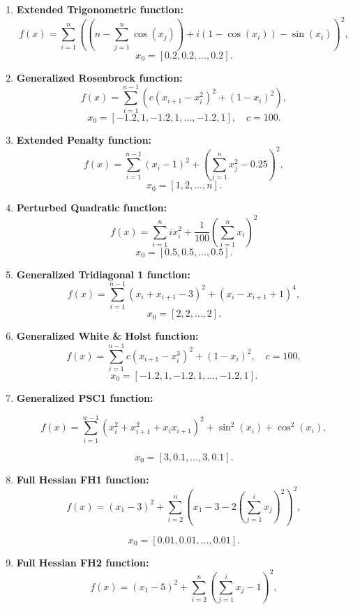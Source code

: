 \begin{enumerate}
    \item \textbf{Extended Trigonometric function:}
    \[
    f(x) = \sum_{i=1}^{n} \left( (n - \sum_{j=1}^{n} \cos(x_j)) + i \left( 1 - \cos(x_i) \right) - \sin(x_i) \right)^2,
    \]
    \[
    x_0 = [0.2, 0.2, \dots, 0.2].
    \]

    \item \textbf{Generalized Rosenbrock function:}
    \[
    f(x) = \sum_{i=1}^{n-1} \left( c(x_{i+1} - x_i^2)^2 + (1 - x_i)^2 \right),
    \]
    \[
    x_0 = [-1.2, 1, -1.2, 1, \dots, -1.2, 1], \quad c = 100.
    \]

    \item \textbf{Extended Penalty function:}
    \[
    f(x) =  \sum_{i=1}^{n-1} (x_i - 1)^2 + \left(\sum_{j=1}^{n}  x_j^2 - 0.25 \right)^2,
    \]
    \[
    x_0 = [1, 2, \dots, n].
    \]

    \item \textbf{Perturbed Quadratic function:}
    \[
    f(x) = \sum_{i=1}^{n} i x_i^2 + \frac{1}{100}\left(\sum_{i=1}^{n} x_i \right)^2
    \]
    \[
    x_0 = [0.5, 0.5, \dots, 0.5].
    \]

    \item \textbf{Generalized Tridiagonal 1 function:}
    \[
    f(x) = \sum_{i=1}^{n-1} ( x_i +  x_{i+1} - 3)^2 + (x_{i} - x_{i+1} + 1)^4,
    \]
    \[
    x_0 = [2, 2, \dots, 2].
    \]

    \item \textbf{Generalized White \& Holst function:}
    \[
    f(x) = \sum_{i=1}^{n-1} c(x_{i+1} - x_i^3)^2 + (1 - x_i)^2 , \quad c = 100,
    \]
    \[
    x_0 = [-1.2, 1, -1.2, 1, \dots, -1.2, 1].
    \]

    \item \textbf{Generalized PSC1 function:}

    \[
    f(x) = \sum_{i=1}^{n-1} \left( x_i^2 + x_{i+1}^2 + x_{i} x_{i+1} \right)^2 + \sin^2(x_{i}) + \cos^2(x_{i}),
    \]
    
    \[
    x_0 = [3, 0.1, \ldots, 3, 0.1].
    \]

    \item \textbf{Full Hessian FH1 function:}
    \[
    f(x) = (x_1 - 3)^2 + \sum_{i=2}^n \left( x_1 - 3 - 2\left( \sum_{j=1}^i x_j \right)^2 \right)^2,
    \]

    \[
    x_0 = [0.01, 0.01, \ldots, 0.01].
    \]

    \item \textbf{Full Hessian FH2 function:}
    \[
    f(x) = (x_1 - 5)^2 + \sum_{i=2}^n \left(\sum_{j=1}^i x_j - 1 \right)^2,
    \]


\end{enumerate}
